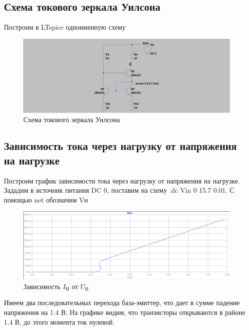 \documentclass[a4paper, 12pt]{article}
\begin{document}
    \subsection{Схема токового зеркала Уилсона}
    Построим в LTspice одноименную схему
    \begin{figure}[H]
        \centering
        \includegraphics[scale=0.22]{scheme2.png}
        \captionsetup{skip=0pt}
        \caption{Схема токового зеркала Уилсона}
        \label{fig:scheme2}
    \end{figure}


    \subsection{Зависимость тока через нагрузку от напряжения на нагрузке}
    Построим график зависимости тока через нагрузку от напряжения на нагрузке.
    Зададим в источник питания DC 0, поставим на схему .dc Vin 0 15.7 0.01.
    С помощью net обозначим Vн
    \begin{figure}[H]
        \centering
        \includegraphics[scale=0.46]{2task_Iн(Vн).png}
        \captionsetup{skip=0pt}
        \caption{Зависимость $I_\text{Н}$ от $U_\text{Н}$}
        \label{fig:2task_InVn}
    \end{figure}
    \noindent Имеем два последовательных перехода база-эмиттер, что дает в сумме падение напряжения на 1.4 В.
    На графике видим, что транзисторы открываются в районе 1.4 В, до этого момента ток нулевой.
\end{document}
